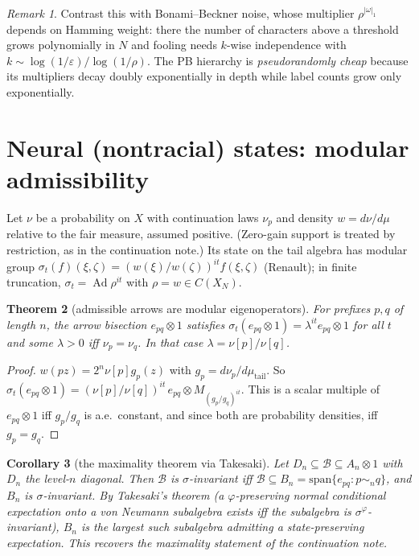 \documentclass[11pt]{article}
\newtheorem{theorem}{Theorem}[section]
\newtheorem{corollary}[theorem]{Corollary}
\theoremstyle{definition}
\theoremstyle{remark}
\newtheorem{remark}[theorem]{Remark}
\newcommand{\Ad}{\operatorname{Ad}}
\newcommand{\tail}{\mathrm{tail}}
\begin{document}
\begin{remark}
Contrast this with Bonami--Beckner noise, whose multiplier $\rho^{|\omega|_1}$ depends on Hamming weight: there the number of characters above a threshold grows polynomially in $N$ and fooling needs $k$-wise independence with $k\sim\log(1/\varepsilon)/\log(1/\rho)$. The PB hierarchy is \emph{pseudorandomly cheap} because its multipliers decay doubly exponentially in depth while label counts grow only exponentially.
\end{remark}

\section{Neural (nontracial) states: modular admissibility}\label{sec:modular}

Let $\nu$ be a probability on $X$ with continuation laws $\nu_p$ and density $w=d\nu/d\mu$ relative to the fair measure, assumed positive. (Zero-gain support is treated by restriction, as in the continuation note.) Its state on the tail algebra has modular group $\sigma_t(f)(\xi,\zeta)=(w(\xi)/w(\zeta))^{it}f(\xi,\zeta)$ (Renault); in finite truncation, $\sigma_t=\Ad\rho^{it}$ with $\rho=w\in C(X_N)$.

\begin{theorem}[admissible arrows are modular eigenoperators]\label{thm:modular}
For prefixes $p,q$ of length $n$, the arrow bisection $e_{pq}\otimes1$ satisfies $\sigma_t(e_{pq}\otimes1)=\lambda^{it}e_{pq}\otimes1$ for all $t$ and some $\lambda>0$ iff $\nu_p=\nu_q$. In that case $\lambda=\nu[p]/\nu[q]$.
\end{theorem}

\begin{proof}
$w(pz)=2^n\nu[p]g_p(z)$ with $g_p=d\nu_p/d\mu_\tail$. So $\sigma_t(e_{pq}\otimes1)=(\nu[p]/\nu[q])^{it}\,e_{pq}\otimes M_{(g_p/g_q)^{it}}$. This is a scalar multiple of $e_{pq}\otimes1$ iff $g_p/g_q$ is a.e.\ constant, and since both are probability densities, iff $g_p=g_q$.
\end{proof}

\begin{corollary}[the maximality theorem via Takesaki]\label{cor:takesaki}
Let $D_n\subseteq\mathcal B\subseteq A_n\otimes1$ with $D_n$ the level-$n$ diagonal. Then $\mathcal B$ is $\sigma$-invariant iff $\mathcal B\subseteq B_n=\mathrm{span}\{e_{pq}:p\sim_nq\}$, and $B_n$ is $\sigma$-invariant. By Takesaki's theorem (a $\varphi$-preserving normal conditional expectation onto a von Neumann subalgebra exists iff the subalgebra is $\sigma^\varphi$-invariant), $B_n$ is the largest such subalgebra admitting a state-preserving expectation. This recovers the maximality statement of the continuation note.
\end{corollary}
\end{document}
